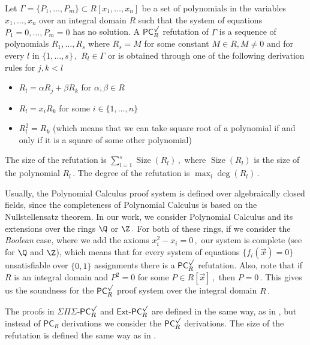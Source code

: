 \documentclass{toc}
\DeclareMathOperator{\Size}{\mathrm{Size}}   %
\begin{document}
\begin{definition}\label{def:PCS}
Let $\Gamma = \{P_1, \ldots, P_m\} \subset R[x_1, \ldots, x_n]$ be a set of polynomials in the variables %
$x_1, \ldots, x_n$ %
 over an integral domain $R$ such that the system of equations $P_1 = 0, \ldots, P_m = 0$ has no solution. A $\mathsf{PC}^{\surd}_{R}$ refutation of $\Gamma$ is a sequence of polynomials $R_1, \ldots, R_s$ where $R_s = M$ for some constant $M \in R, M \neq 0$ and for every $l$ in %
$\{1, \ldots, s\}\,,$ %
 $R_l \in \Gamma$ or is obtained through one of the following derivation rules for $j, k < l$
\begin{itemize}
    \item $R_l = \alpha R_j + \beta R_k$ for $\alpha, \beta \in R$
    \item $R_l = x_i R_k$ for some $i \in \{1, \ldots, n\}$
    \item $R_l^2 = R_k$ (which means that we can take square root of a polynomial if and only if it is a square of some other polynomial)
\end{itemize}
The size of the refutation is %
$\sum_{l = 1}^s \Size(R_l)\,,$ %
 where $\Size(R_l)$ is the size of the polynomial %
$R_l\,.$ %
 The degree of the refutation is %
%
$\max_l \deg(R_l)\,.$ %
%
\end{definition}

\begin{remark}
Usually, the Polynomial Calculus proof system is defined over algebraically closed fields, since the completeness of Polynomial Calculus is based on the Nullstellensatz theorem. In our work, we consider Polynomial Calculus and its extensions over the rings $\Q$ or %
$\Z\,.$ %
 For both of these rings, if we consider the \emph{Boolean} case, where we add the axioms %
$x_i^2 - x_i = 0\,,$ %
 our system is complete (see \cite{CEI96, AGHT19_new} for $\Q$ and $\Z$), which means that for every system of equations $\{f_i(\vec x) = 0\}$ unsatisfiable over $\{0, 1\}$ %
assignments  %
there is a  $\mathsf{PC}^{\surd}_{R}$ refutation. Also, note that if $R$ is an integral domain and $P^2 = 0$ for some %
$P \in R[\vec x]\,,$ %
 then %
$P = 0\,.$ %
 This gives us the soundness for
the  %
$\mathsf{PC}^{\surd}_{R}$  proof system over the integral domain %
$R\,.$ %
\end{remark}


\begin{definition}
The proofs in $\Sigma \Pi \Sigma$-$\mathsf{PC}_R^\surd$ and $\mathsf{Ext}$-$\mathsf{PC}_{R}^\surd$ are defined in the same way,
%
%
as in  , %
but instead of $\mathsf{PC}_{R}$ derivations we consider the $\mathsf{PC}^{\surd}_{R}$ derivations. 
%
The size of the refutation is defined the same way as in
%
 . %
\end{definition}
\end{document}
